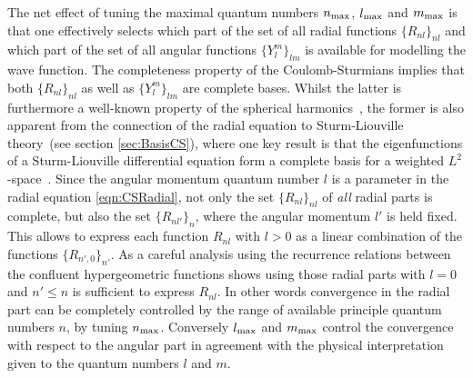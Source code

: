 The net effect of tuning the maximal quantum numbers $n_\text{max}$, $l_\text{max}$ and $m_\text{max}$
is that one effectively selects which part
of the set of all radial functions $\{R_{nl}\}_{nl}$
and which part of the set of all angular functions $\{Y_l^m\}_{lm}$
is available for modelling the wave function.
The completeness property of the Coulomb-Sturmians
implies that both $\{R_{nl}\}_{nl}$
as well as $\{Y_l^m\}_{lm}$ are complete bases.
Whilst the latter is furthermore
a well-known property of the spherical harmonics~\cite{Avery2018},
the former is also apparent from the connection of the \CS radial equation
to Sturm-Liouville theory~(see section \vref{sec:BasisCS}),
where one key result is that the eigenfunctions of a Sturm-Liouville
differential equation form a complete basis for a weighted $L^2$-space~\cite{Avery2006}.
Since the angular momentum quantum number $l$
is a parameter in the \CS radial equation \eqref{eqn:CSRadial},
not only the set $\{R_{nl}\}_{nl}$ of \emph{all} radial parts is complete,
but also the set $\{R_{nl'}\}_{n}$, where the angular momentum $l'$ is held fixed.
This allows to express each function $R_{nl}$ with $l>0$
as a linear combination of the functions $\{R_{n',0}\}_{n'}$.
As a careful analysis using the recurrence relations between the
confluent hypergeometric functions shows using those radial parts
with $l=0$ and $n' \leq n$ is sufficient to express $R_{nl}$.
In other words convergence in the radial part can be completely controlled
by the range of available principle quantum numbers $n$,
\ie by tuning $n_\text{max}$.
Conversely $l_\text{max}$ and $m_\text{max}$ control the convergence with respect to the angular part
in agreement with the physical interpretation given to the quantum numbers $l$ and $m$.

